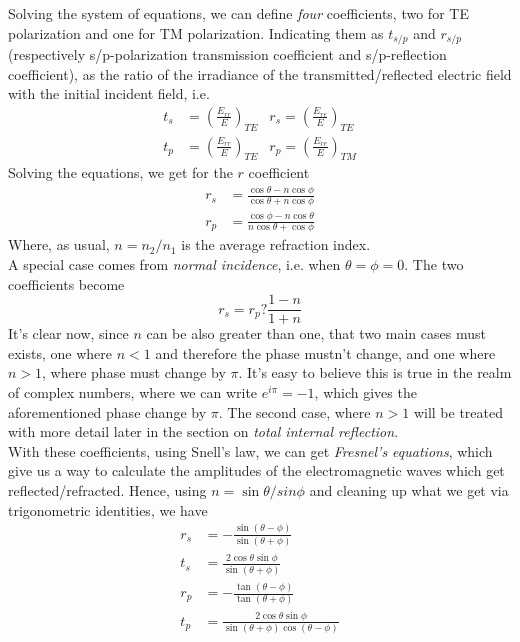 \documentclass[../electromagnetism.tex]{subfiles}
\begin{document}
Solving the system of equations, we can define \textit{four} coefficients, two for TE polarization and one for TM polarization. Indicating them as $t_{s/p}$ and $r_{s/p}$ (respectively s/p-polarization transmission coefficient and s/p-reflection coefficient), as the ratio of the irradiance of the transmitted/reflected electric field with the initial incident field, i.e.
\begin{equation}
	\begin{aligned}
		t_s&=\left( \frac{E_{rr}}{E} \right)_{TE}&r_s=\left( \frac{E_{re}}{E} \right)_{TE}\\
		t_p&= \left( \frac{E_{rr}}{E} \right)_{TE}&r_p=\left( \frac{E_{re}}{E} \right)_{TM}
	\end{aligned}
	\label{eq:rtfirstdef}
\end{equation}
Solving the equations, we get for the $r$ coefficient
\begin{equation}
	\begin{aligned}
		r_s&= \frac{\cos\theta-n\cos\phi}{\cos\theta+n\cos\phi}\\
		r_p&= \frac{\cos\phi-n\cos\theta}{n\cos\theta+\cos\phi}
	\end{aligned}
	\label{eq:rsrpgeneral}
\end{equation}
Where, as usual, $n=n_2/n_1$ is the average refraction index.\\
A special case comes from \emph{normal incidence}, i.e. when $\theta=\phi=0$. The two coefficients become
\begin{equation}
	r_s=r_p?\frac{1-n}{1+n}
	\label{eq:normalincidencersrp}
\end{equation}
It's clear now, since $n$ can be also greater than one, that two main cases must exists, one where $n<1$ and therefore the phase mustn't change, and one where $n>1$, where phase must change by $\pi$. It's easy to believe this is true in the realm of complex numbers, where we can write $e^{i\pi}=-1$, which gives the aforementioned phase change by $\pi$. The second case, where $n>1$ will be treated with more detail later in the section on \textit{total internal reflection}.\\
With these coefficients, using Snell's law, we can get \textit{Fresnel's equations}, which give us a way to calculate the amplitudes of the electromagnetic waves which get reflected/refracted. Hence, using $n=\sin\theta/sin\phi$ and cleaning up what we get via trigonometric identities, we have
\begin{equation}
	\begin{aligned}
		r_s&= -\frac{\sin(\theta-\phi)}{\sin(\theta+\phi)}\\
		t_s&= \frac{2\cos\theta\sin\phi}{\sin(\theta+\phi)}\\
		r_p&= -\frac{\tan(\theta-\phi)}{\tan(\theta+\phi)}\\
		t_p&= \frac{2\cos\theta\sin\phi}{\sin(\theta+\phi)\cos(\theta-\phi)}
	\end{aligned}
	\label{eq:fresneleqs}
\end{equation}
\end{document}
